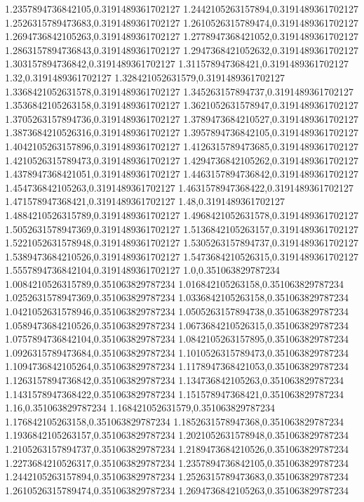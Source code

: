 1.2357894736842105,0.3191489361702127
1.2442105263157894,0.3191489361702127
1.2526315789473683,0.3191489361702127
1.2610526315789474,0.3191489361702127
1.2694736842105263,0.3191489361702127
1.2778947368421052,0.3191489361702127
1.2863157894736843,0.3191489361702127
1.2947368421052632,0.3191489361702127
1.303157894736842,0.3191489361702127
1.311578947368421,0.3191489361702127
1.32,0.3191489361702127
1.328421052631579,0.3191489361702127
1.3368421052631578,0.3191489361702127
1.345263157894737,0.3191489361702127
1.3536842105263158,0.3191489361702127
1.3621052631578947,0.3191489361702127
1.3705263157894736,0.3191489361702127
1.3789473684210527,0.3191489361702127
1.3873684210526316,0.3191489361702127
1.3957894736842105,0.3191489361702127
1.4042105263157896,0.3191489361702127
1.4126315789473685,0.3191489361702127
1.4210526315789473,0.3191489361702127
1.4294736842105262,0.3191489361702127
1.4378947368421051,0.3191489361702127
1.4463157894736842,0.3191489361702127
1.454736842105263,0.3191489361702127
1.4631578947368422,0.3191489361702127
1.471578947368421,0.3191489361702127
1.48,0.3191489361702127
1.4884210526315789,0.3191489361702127
1.4968421052631578,0.3191489361702127
1.5052631578947369,0.3191489361702127
1.5136842105263157,0.3191489361702127
1.5221052631578948,0.3191489361702127
1.5305263157894737,0.3191489361702127
1.5389473684210526,0.3191489361702127
1.5473684210526315,0.3191489361702127
1.5557894736842104,0.3191489361702127
1.0,0.351063829787234
1.0084210526315789,0.351063829787234
1.016842105263158,0.351063829787234
1.0252631578947369,0.351063829787234
1.0336842105263158,0.351063829787234
1.0421052631578946,0.351063829787234
1.0505263157894738,0.351063829787234
1.0589473684210526,0.351063829787234
1.0673684210526315,0.351063829787234
1.0757894736842104,0.351063829787234
1.0842105263157895,0.351063829787234
1.0926315789473684,0.351063829787234
1.1010526315789473,0.351063829787234
1.1094736842105264,0.351063829787234
1.1178947368421053,0.351063829787234
1.1263157894736842,0.351063829787234
1.134736842105263,0.351063829787234
1.1431578947368422,0.351063829787234
1.151578947368421,0.351063829787234
1.16,0.351063829787234
1.168421052631579,0.351063829787234
1.176842105263158,0.351063829787234
1.1852631578947368,0.351063829787234
1.1936842105263157,0.351063829787234
1.2021052631578948,0.351063829787234
1.2105263157894737,0.351063829787234
1.2189473684210526,0.351063829787234
1.2273684210526317,0.351063829787234
1.2357894736842105,0.351063829787234
1.2442105263157894,0.351063829787234
1.2526315789473683,0.351063829787234
1.2610526315789474,0.351063829787234
1.2694736842105263,0.351063829787234
